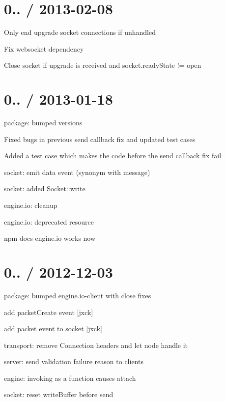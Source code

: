 \section*{0.. / 2013-\/02-\/08 }


\begin{DoxyItemize}
\item Only end upgrade socket connections if unhandled
\item Fix websocket dependency
\item Close socket if upgrade is received and socket.\+ready\+State != open
\end{DoxyItemize}

\section*{0.. / 2013-\/01-\/18 }


\begin{DoxyItemize}
\item package\+: bumped versions
\item Fixed bugs in previous send callback fix and updated test cases
\item Added a test case which makes the code before the send callback fix fail
\item socket\+: emit {\ttfamily data} event (synonym with {\ttfamily message})
\item socket\+: added {\ttfamily Socket\+::write}
\item engine.\+io\+: cleanup
\item engine.\+io\+: deprecated {\ttfamily resource}
\item {\ttfamily npm docs engine.\+io} works now
\end{DoxyItemize}

\section*{0.. / 2012-\/12-\/03 }


\begin{DoxyItemize}
\item package\+: bumped {\ttfamily engine.\+io-\/client} with {\ttfamily close} fixes
\item add packet\+Create event \mbox{[}jxck\mbox{]}
\item add packet event to socket \mbox{[}jxck\mbox{]}
\item transport\+: remove {\ttfamily Connection} headers and let node handle it
\item server\+: send validation failure reason to clients
\item engine\+: invoking as a function causes attach
\item socket\+: reset {\ttfamily write\+Buffer} before send
\end{DoxyItemize}

